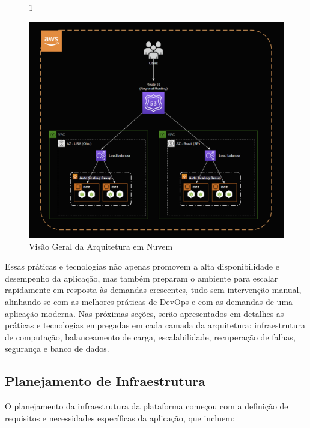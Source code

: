 \begin{figure}[H]{1\textwidth}
    \centering
    \caption{Visão Geral da Arquitetura em Nuvem}
    \label{fig:cloud-architecture}
    \includegraphics[width=1\textwidth]{drawio/cloud-architecture.png}
\end{figure}

Essas práticas e tecnologias não apenas promovem a alta disponibilidade e desempenho da aplicação, mas também preparam o ambiente para escalar rapidamente em resposta às demandas crescentes, tudo sem intervenção manual, alinhando-se com as melhores práticas de DevOps e com as demandas de uma aplicação moderna. Nas próximas seções, serão apresentados em detalhes as práticas e tecnologias empregadas em cada camada da arquitetura: infraestrutura de computação, balanceamento de carga, escalabilidade, recuperação de falhas, segurança e banco de dados.


\subsection{Planejamento de Infraestrutura}

O planejamento da infraestrutura da plataforma começou com a definição de requisitos e necessidades específicas da aplicação, que incluem:

